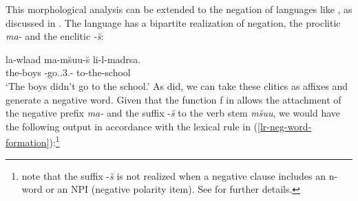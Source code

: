 \documentclass[output=paper
	        ,collection
	        ,collectionchapter
 	        ,biblatex
                ,babelshorthands
                ,newtxmath
                ,draftmode
                ,colorlinks, citecolor=brown
]{langscibook}
\begin{document}
\begin{exe}
\begin{xlist}
\begin{exe}
\begin{xlist}
This morphological analysis can be extended to the negation of languages
like , as discussed in \citet{BK:12}. The language
has a bipartite realization of negation, the proclitic \emph{ma-} and the enclitic \emph{-\u{s}}:

\ea
\gll la-wlaad ma-m\u{s}uu-\u{s} li-l-madrsa. \\
     the-boys \NEG-go.\pst.3.\pl-\NEG{} to-the-school\\
\glt `The boys didn't go to the school.'
\z
%
As \citet{BK:12} did, we can take these clitics as affixes and generate
a negative word. Given that the function
f in  allows the attachment of the negative prefix
\textit{ma-} and the suffix -\textit{\u{s}} to the verb
stem \emph{m\u{s}uu}, we would have the following output in accordance
with the lexical rule in (\ref{lr-neg-word-formation}):\footnote{%
   \citet{BK:12} note that the suffix -\textit{\u{s}} is not realized when a negative clause
   includes an n-word or an NPI (negative polarity item). See \citet{BK:12} for further details.}
%
%


\ea
\z

\end{xlist}
\end{exe}
\end{xlist}
\end{exe}
\end{document}
